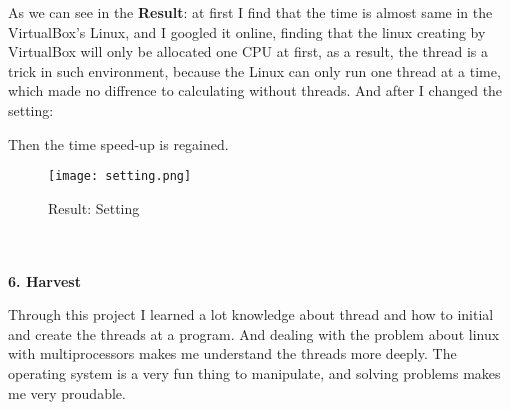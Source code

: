 \documentclass[12pt,a4paper]{article}
\begin{document}
As we can see in the {\bf Result}: at first I find that the time is almost same in the VirtualBox's Linux, and I googled it online, finding that the linux creating by VirtualBox will only be allocated one CPU at first, as a result, the thread is a trick in such environment, because the Linux can only run one thread at a time, which made no diffrence to calculating without threads. And after I changed the setting:

Then the time speed-up is regained.
\begin{figure}[H]
  \centering
  \texttt{[image: setting.png]}
  \caption{Result: Setting}%
\end{figure}

\begin{large}
~\\
~\\
\textbf{6. Harvest}
\end{large}

Through this project I learned a lot knowledge about thread and how to initial and create the threads at a program. And dealing with the problem about linux with multiprocessors makes me understand the threads more deeply. The operating system is a very fun thing to manipulate, and solving problems makes me very proudable.
\end{document}
